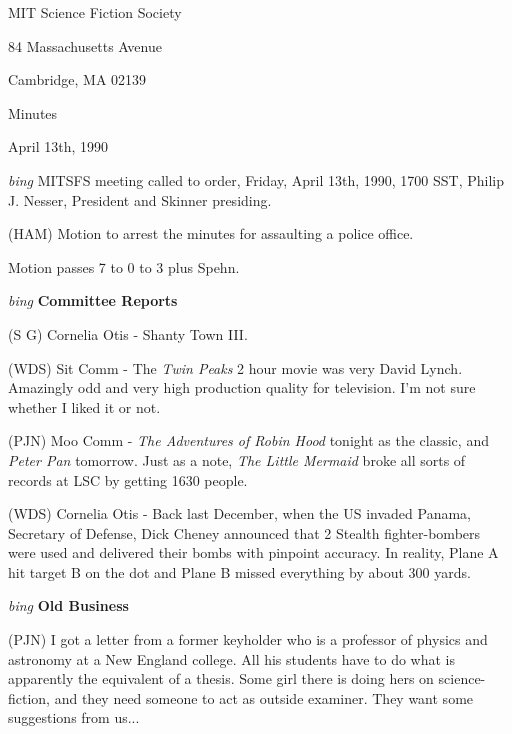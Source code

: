 \setlength{\topmargin}{-0.5in}
\setlength{\oddsidemargin}{0.0in}
\setlength{\evensidemargin}{0.0in}
\setlength{\textheight}{9in}
\setlength{\textwidth}{6.5in}



\begin{center}
MIT Science Fiction Society

84 Massachusetts Avenue

Cambridge, MA 02139

\vspace{0.2in}
Minutes

April 13th, 1990

\end{center}
 
\vspace{0.15in}
{\em bing\/}  MITSFS meeting called to order, Friday, April 13th, 1990,
1700 SST, Philip J. Nesser, President and Skinner presiding.

(HAM) Motion to arrest the minutes for assaulting a police office.

Motion passes 7 to 0 to 3 plus Spehn.

\vspace{0.15in}
{\em bing\/} {\bf Committee Reports}

(S G) Cornelia Otis - Shanty Town III.

(WDS) Sit Comm - The {\em Twin Peaks} 2 hour movie was very David
Lynch.  Amazingly odd and very high production quality for television.
I'm not sure whether I liked it or not.

(PJN) Moo Comm - {\em The Adventures of Robin Hood} tonight as the
classic, and {\em Peter Pan} tomorrow.  Just as a note, {\em The
Little Mermaid} broke all sorts of records at LSC by getting 1630
people.

(WDS) Cornelia Otis - Back last December, when the US invaded Panama,
Secretary of Defense, Dick Cheney announced that 2 Stealth
fighter-bombers were used and delivered their bombs with pinpoint
accuracy.  In reality, Plane A hit target B on the dot and Plane B
missed everything by about 300 yards.

\vspace{0.15in}
{\em bing\/} {\bf Old Business}

(PJN) I got a letter from a former keyholder who is a professor of
physics and astronomy at a New England college.  All his students have
to do what is apparently the equivalent of a thesis.  Some girl there
is doing hers on science-fiction, and they need someone to act as
outside examiner.  They want some suggestions from us...

